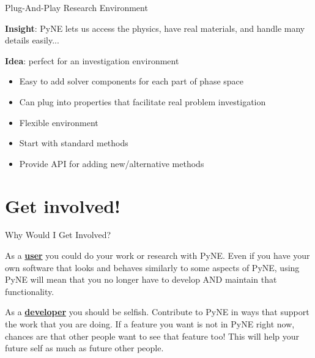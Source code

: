 \documentclass[xcolor=x11names,compress]{beamer}
\renewcommand{\(}{\begin{columns}}
\renewcommand{\)}{\end{columns}}
\newcommand{\<}[1]{\begin{column}{#1}}
\renewcommand{\>}{\end{column}}
\begin{document}
\begin{frame}{Plug-And-Play Research Environment}

    \textbf{Insight}: PyNE lets us access the physics, have real materials, 
    and handle many details easily...
    
    \vspace{1 em}
    \textbf{Idea}: perfect for an investigation environment
    
    \begin{itemize}
    \item Easy to add solver components for each part of phase space
    \item Can plug into properties that facilitate real problem investigation
    \item Flexible environment
    \item Start with standard methods
    \item Provide API for adding new/alternative methods
    \end{itemize}
    
\end{frame}

\section{Get involved!}
\begin{frame}{Why Would I Get Involved?}

As a \underline{\textcolor{byellow}{\textbf{user}}} you could do your work or research with PyNE.  Even if you have your own software that looks and behaves similarly to some aspects of PyNE, using PyNE will mean that you no longer have to develop AND maintain that functionality.

\vspace*{2 em}
As a \underline{\textcolor{byellow}{\textbf{developer}}} you should be selfish.  Contribute to PyNE in ways that support the work that you are doing. If a feature you want is not in PyNE right now, chances are that other people want to see that feature too! This will help your future self as much as future other people.

\end{frame}
\end{document}
